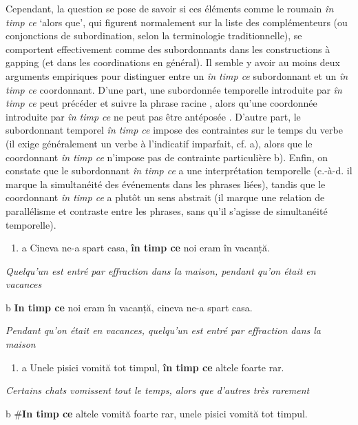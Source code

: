 Cependant, la question se pose de savoir si ces éléments comme le roumain \textit{în timp ce} `alors que', qui figurent normalement sur la liste des complémenteurs (ou conjonctions de subordination, selon la terminologie traditionnelle), se comportent effectivement comme des subordonnants dans les constructions à gapping (et dans les coordinations en général). Il semble y avoir au moins deux arguments empiriques pour distinguer entre un \textit{în timp ce} subordonnant et un \textit{în timp ce} coordonnant. D'une part, une subordonnée temporelle introduite par \textit{în timp ce} peut précéder et suivre la phrase racine , alors qu'une coordonnée introduite par \textit{în timp ce} ne peut pas être antéposée . D'autre part, le subordonnant temporel \textit{în timp ce} impose des contraintes sur le temps du verbe (il exige généralement un verbe à l'indicatif imparfait, cf. a), alors que le coordonnant \textit{în timp ce} n'impose pas de contrainte particulière b). Enfin, on constate que le subordonnant \textit{în timp ce} a une interprétation temporelle (c.-à-d. il marque la simultanéité des événements dans les phrases liées), tandis que le coordonnant \textit{în timp ce} a plutôt un sens abstrait (il marque une relation de parallélisme et contraste entre les phrases, sans qu'il s'agisse de simultanéité temporelle).


\begin{enumerate}
\item \label{bkm:Ref299645088}a  Cineva ne-a spart casa, \textbf{în timp ce} noi eram în vacanță.


\end{enumerate}
{\itshape
Quelqu'un est entré par effraction dans la maison, pendant qu'on était en vacances} 

  b  \textbf{In timp ce} noi eram în vacanță, cineva ne-a spart casa.

    \textit{Pendant qu'on était en vacances, quelqu'un est entré par effraction dans la maison}


\begin{enumerate}
\item \label{bkm:Ref299645112}a  Unele pisici vomită tot timpul, \textbf{în timp ce} altele foarte rar.


\end{enumerate}
{\itshape
Certains chats vomissent tout le temps, alors que d'autres très rarement  } 

  b  \#\textbf{In timp ce} altele vomită foarte rar, unele pisici vomită tot timpul.

